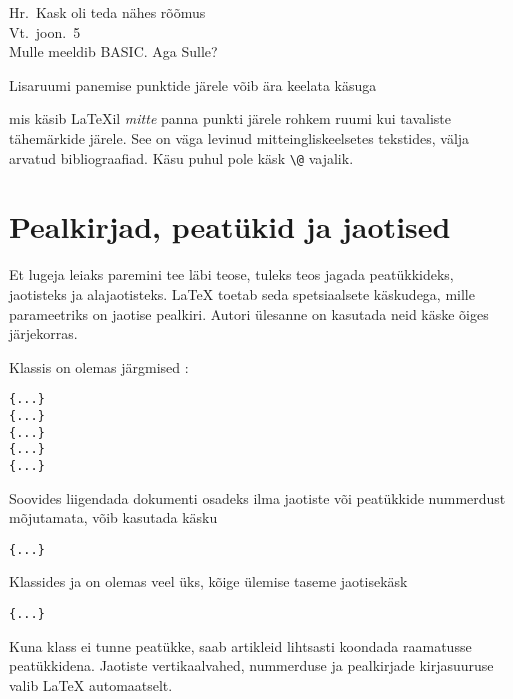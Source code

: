 \begin{example}
Hr.~Kask oli teda nähes rõõmus\\
Vt.~joon.~5\\
Mulle meeldib BASIC\@. Aga Sulle?
\end{example}

Lisaruumi panemise punktide järele võib ära keelata käsuga
\begin{lscommand}
\end{lscommand}
\noindent mis käsib \LaTeX il \emph{mitte} panna punkti järele rohkem
ruumi kui tavaliste tähemärkide järele. See on väga levinud
mitteingliskeelsetes tekstides, välja arvatud bibliograafiad. Käsu
 puhul pole käsk \verb|\@| vajalik.

\section{Pealkirjad, peatükid ja jaotised}

Et lugeja leiaks paremini tee läbi teose, tuleks teos jagada
peatükkideks, jaotisteks ja alajaotisteks. \LaTeX{} toetab seda
spetsiaalsete käskudega, mille parameetriks on jaotise pealkiri. Autori
ülesanne on kasutada neid käske õiges järjekorras.

Klassis  on olemas järgmised
:

\begin{lscommand}
\verb|{...}|\\
\verb|{...}|\\
\verb|{...}|\\
\verb|{...}|\\
\verb|{...}|
\end{lscommand}

Soovides liigendada dokumenti osadeks ilma jaotiste või peatükkide
nummerdust mõjutamata, võib kasutada käsku
\begin{lscommand}
\verb|{...}|
\end{lscommand}

Klassides  ja  on olemas veel üks, kõige
ülemise taseme jaotisekäsk
\begin{lscommand}
\verb|{...}|
\end{lscommand}

Kuna klass  ei tunne peatükke, saab artikleid lihtsasti
koondada raamatusse peatükkidena. Jaotiste vertikaalvahed, nummerduse
ja pealkirjade kirjasuuruse valib \LaTeX{} automaatselt.

